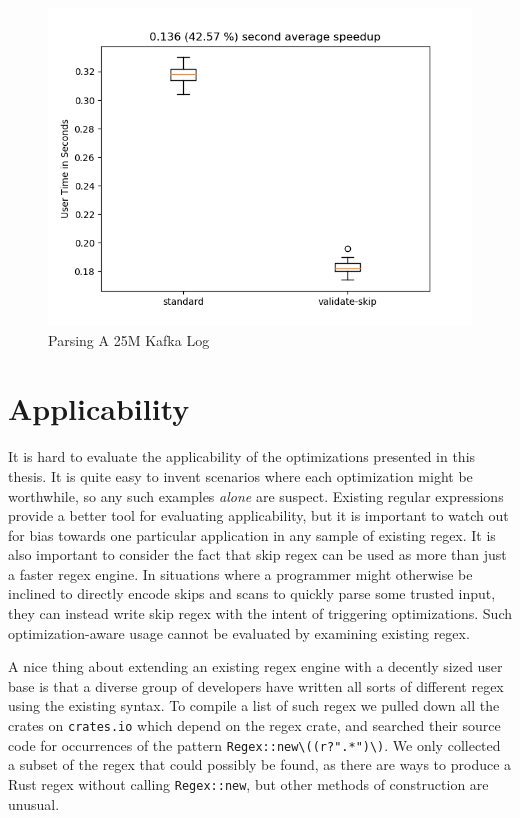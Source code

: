 \begin{figure}
\caption{Parsing A 25M Kafka Log}
\label{fig:append:named}

\includegraphics{resources/append-named.png}
\end{figure}

\section{Applicability}
\label{section:applicability}

It is hard to evaluate the applicability of the optimizations presented
in this thesis. It is quite easy to invent scenarios where each
optimization might be worthwhile, so any such examples \emph{alone} are
suspect. Existing regular expressions provide a better tool for
evaluating applicability, but it is important to watch out for
bias towards one particular application in any sample of existing
regex. It is also important to consider the fact that skip regex
can be used as more than just a faster regex engine. In situations
where a programmer might otherwise be inclined to directly encode
skips and scans to quickly parse some trusted input, they can
instead write skip regex with the intent of triggering optimizations.
Such optimization-aware usage cannot be evaluated by examining
existing regex.

A nice thing about extending an existing regex engine
with a decently sized user base is that a diverse group of developers
have written all sorts of different regex using the existing syntax.
To compile a list of such regex we pulled down all the
crates on \verb'crates.io' which depend on the regex crate, and
searched their source code for occurrences of the pattern
\verb'Regex::new\((r?".*")\)'. We only collected a subset of
the regex that could possibly be found, as there are ways to
produce a Rust regex without calling \verb'Regex::new', but
other methods of construction are unusual.

